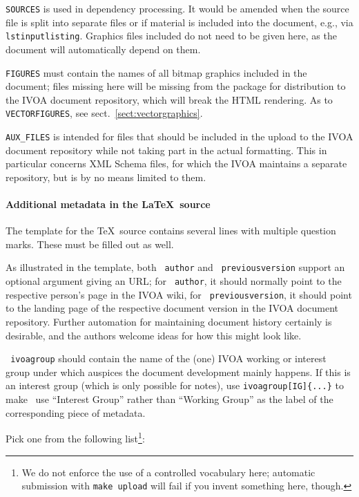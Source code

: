 \documentclass[11pt,a4paper]{ivoa}
\newcommand{\texword}[1]{\texttt{\color{texcolor} #1}}
\begin{document}
\texttt{SOURCES} is used in dependency processing.  It would be amended
when the source file is split into separate files or if material is
included into the document, e.g., via \texword{lstinputlisting}.
Graphics files included do not need to be given here, as the document
will automatically depend on them.

\texttt{FIGURES} must contain the names of all bitmap graphics included
in the document; files missing here will be missing from the package for
distribution to the IVOA document repository, which will break the HTML
rendering.  As to \texttt{VECTORFIGURES}, see
sect.~\ref{sect:vectorgraphics}.

\texttt{AUX\_FILES} is intended for files that should be included in the
upload to the IVOA document repository while not taking part in the
actual formatting.  This in particular concerns XML Schema files, for
which the IVOA maintains a separate repository, but is by no means
limited to them.

\paragraph{Additional metadata in the \LaTeX~source}

The template for the \TeX\ source contains several lines with
multiple question marks.  These must be filled out as well.

As illustrated in the template, both \texword{author} and
\texword{previousversion} support an optional argument giving an URL; for
\texword{author}, it should normally point to the respective person's
page in the IVOA wiki, for \texword{previousversion}, it should point to
the landing page of the respective document version in the IVOA document
repository.  Further automation for maintaining document history
certainly is desirable, and the authors welcome ideas for how this might
look like.

\texword{ivoagroup} should contain the name of the (one) IVOA working or
interest group under which auspices the document development mainly
happens.  If this is an interest group (which is only possible for
notes), use \verb|ivoagroup[IG]{...}| to make \ivoatex~use ``Interest
Group'' rather than ``Working Group'' as the label of the corresponding
piece of metadata.

Pick one from the following list\footnote{We do not
enforce the use of a controlled vocabulary here; automatic submission
with \texttt{make upload} will fail if you invent something here,
though.}:
\end{document}
